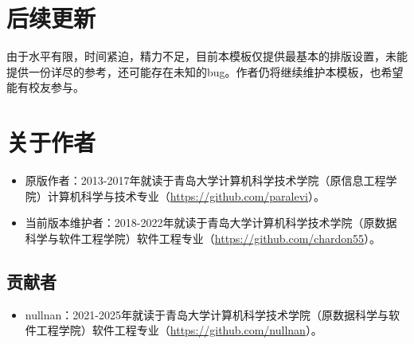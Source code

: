 \section{后续更新}
由于水平有限，时间紧迫，精力不足，目前本模板仅提供最基本的排版设置，未能提供一份详尽的参考，还可能存在未知的bug。作者仍将继续维护本模板，也希望能有校友参与。

\section{关于作者}
\begin{itemize}
    \item 原版作者：2013-2017年就读于青岛大学计算机科学技术学院（原信息工程学院）计算机科学与技术专业（\url{https://github.com/paralevi}）。
    \item 当前版本维护者：2018-2022年就读于青岛大学计算机科学技术学院（原数据科学与软件工程学院）软件工程专业（\url{https://github.com/chardon55}）。
\end{itemize}
\subsection{贡献者}
\begin{itemize}
    \item nullnan：2021-2025年就读于青岛大学计算机科学技术学院（原数据科学与软件工程学院）软件工程专业（\url{https://github.com/nullnan}）。
\end{itemize}